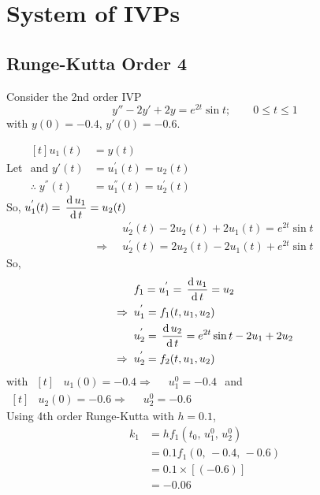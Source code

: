 \documentclass[../main-sheet.tex]{subfiles}
\begin{document}
\chapter{System of IVPs}
\section{Runge-Kutta Order 4}
\begin{prob}
    Consider the 2nd order IVP
    \[
        y''-2y'+2y=e^{2t}\sin t;\qquad 0\leq t\leq 1
    \]
    with \(y(0)=-0.4\), \(y'(0)=-0.6\).
\end{prob}
\begin{soln}
    Let \(\begin{aligned}[t]
        u_1(t)&=y(t)\\
        \text{and } y'(t)&=u_1^{'}(t)=u_2(t)\\
        \therefore\;y^{''}(t)&=u_1^{''}(t)=u_2^{'}(t)
    \end{aligned}
    \)\\
    So, \(\displaystyle u_1^{'}(t)=\,\frac{\mathrm{d}\,u_1}{\mathrm{d}\,t}=u_2(t)\)
    \begin{align*}
        &u_2^{'}(t)-2u_2(t)+2u_1(t)=e^{2t}\sin t\\
        \Rightarrow\;\;&u_2^{'}(t)=2u_2(t)-2u_1(t)+e^{2t}\sin t
    \end{align*}
    So,
    \begin{align*}
        &f_1=u_1^{'}=\,\frac{\mathrm{d}\,u_1}{\mathrm{d}\,t}=u_2\\
        \Rightarrow\;\;&u_1^{'}=f_1(t,u_1,u_2)\\
        &u_2^{'}=\,\frac{\mathrm{d}\,u_2}{\mathrm{d}\,t}=e^{2t}\sin t-2u_1+2u_2\\
        \Rightarrow\;\;&u_2^{'}=f_2(t,u_1,u_2)
    \end{align*} 
    with \(\begin{aligned}[t]
        &u_1(0)=-0.4
        \Rightarrow\;\;&u_1^0=-0.4
    \end{aligned}\) and \(\begin{aligned}[t]
        &u_2(0)=-0.6
        \Rightarrow\;\;&u_2^0=-0.6
    \end{aligned}\)\\
    Using 4th order Runge-Kutta with \(h=0.1\),
    \begin{align*}
        k_1&=hf_1(t_0,\,u_1^0,\,u_2^0)\\
        &=0.1f_1(0,\,-0.4,\,-0.6)\\
        &=0.1\times [(-0.6)]\\
        &=-0.06\\

\end{align*}
\end{soln}
\end{document}
